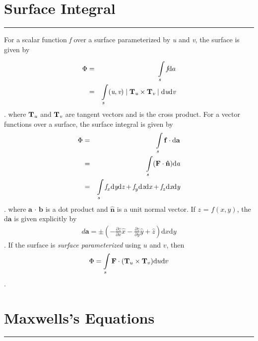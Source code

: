\documentclass[letterpaper,10pt,titlepage,fleqn]{article}
\begin{document}

\section*{Surface Integral}
\addtocounter{section}{1}

\hrule

For a scalar function \textit{f} over a surface parameterized by \textit{u} and \textit{v}, the surface is given by


\begin{eqnarray}
  \Phi &=& \int\limits_s \textit{f} \text{d}a\\
   &=& \int\limits_s(\textit{u},\textit{v}) \mid \bold{T_\textit{u}}\times\bold{T_\textit{v}}\mid \text{d} \textit{u} \text{d} \textit{v}
\end{eqnarray}.
where $\bold{T_\textit{u}}$ and $\bold{T_\textit{v}}$ are tangent vectors and is the cross product.
For a vector functions over a surface, the surface integral is given by 
\begin{eqnarray}
 \Phi &=& \int\limits_s \bold{f} \cdot \text{d} \bold{a}\\
 &=& \int\limits_s (\mathbf{F} \cdot \bold{\hat{n}}) \text{d} \textit{a}\\
 &=& \int\limits_s \textit{f}_{x} \text{d} \textit{y} \text{d} \textit{z} + \textit{f}_{y} \text{d} \textit{z} \text{d} \textit{x}+\textit{f}_{z} \text{d} \textit{x}\text{d} \textit{y}
\end{eqnarray}.
where $\mathbf{a}$ $\cdot$ $\mathbf{b}$ is a dot product and $\mathbf{\hat{n}}$ is a unit normal vector. If $z$ = $f(x,y)$, the d$\mathbf{a}$ is given explicitly by
\begin{eqnarray}
d\mathbf{a} = \pm(- \frac{\partial z}{\partial x}\hat{x}-\frac{\partial z}{\partial y}\hat{y}+\hat{z} )\text{d}x\text{d}y
\end{eqnarray}.
If the surface is \textit{surface parameterized} using $u$ and $v$, then
\begin{eqnarray}
\Phi=\int\limits_s \bold{F} \cdot (\mathbf{T}_{u}\times \mathbf{T}_{v})\text{d}u\text{d}v
\end{eqnarray}.
\section*{Maxwells's Equations}
\addtocounter{section}{1}
\addtocounter{equation}{-7}
\hrule
\end{document}
